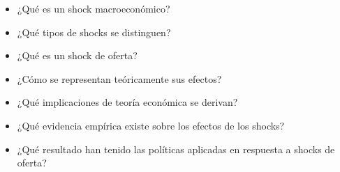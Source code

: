 \documentclass{nuevotema}
\begin{document}
\ideaclave


\begin{itemize}
	\item ¿Qué es un shock macroeconómico?
	\item ¿Qué tipos de shocks se distinguen?
	\item ¿Qué es un shock de oferta?
	\item ¿Cómo se representan teóricamente sus efectos?
	\item ¿Qué implicaciones de teoría económica se derivan?
	\item ¿Qué evidencia empírica existe sobre los efectos de los shocks?
	\item ¿Qué resultado han tenido las políticas aplicadas en respuesta a shocks de oferta?
\end{itemize}

\esquemacorto
\end{document}
